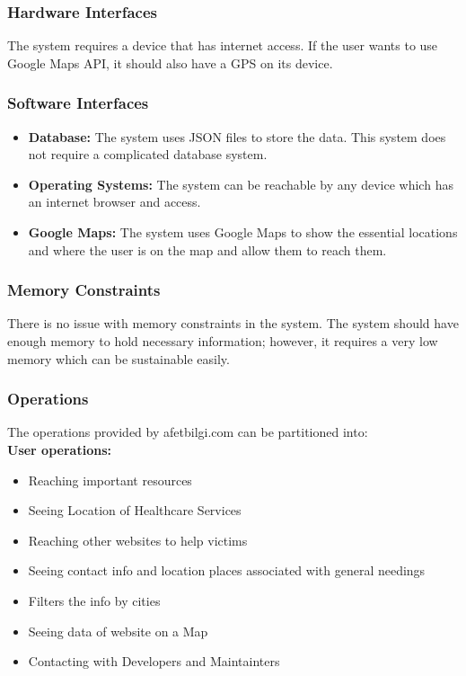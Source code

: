 \subsubsection{Hardware Interfaces}

The system requires a device that has internet access. If the user wants to use Google Maps API, it should also have a GPS on its device.

\subsubsection{Software Interfaces}

\begin{itemize}
    \item \textbf{Database: } The system uses JSON files to store the data. This system does not require a complicated database system.
    \item \textbf{Operating Systems: } The system can be reachable by any device which has an internet browser and access.
    \item \textbf{Google Maps: } The system uses Google Maps to show the essential locations and where the user is on the map and allow them to reach them.
\end{itemize}

\subsubsection{Memory Constraints}

There is no issue with memory constraints in the system. The system should have enough memory to hold necessary information; however, it requires a very low memory which can be sustainable easily. 

\subsubsection{Operations}

The operations provided by afetbilgi.com can be partitioned into: \\

\textbf{User operations: }

\begin{itemize}
    \item Reaching important resources
    \item Seeing Location of Healthcare Services
    \item Reaching other websites to help victims
    \item Seeing contact info and location places associated with general needings
    \item Filters the info by cities
    \item Seeing data of website on a Map
    \item Contacting with Developers and Maintainters
\end{itemize}

